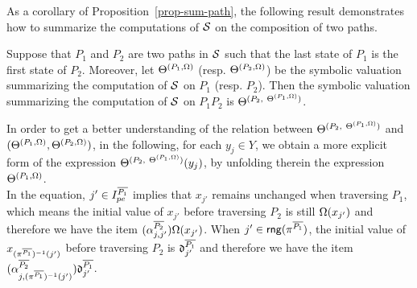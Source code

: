 As a corollary of Proposition~\ref{prop-sum-path}, the following result demonstrates how to summarize the computations of ${\mathcal{S} }$ on the composition of two paths.

\begin{corollary}\label{cor-comp-two-paths}
Suppose that $P_1$ and $P_2$ are two paths in ${\mathcal{S} }$ such that the last state of $P_1$ is the first state of $P_2$. Moreover, let $\Theta^{(P_1, \Omega)}$ (resp. $\Theta^{(P_2, \Omega)}$) be the symbolic valuation summarizing the computation of ${\mathcal{S} }$ on $P_1$ (resp. $P_2$). Then the symbolic valuation summarizing the computation of ${\mathcal{S} }$ on $P_1 P_2$ is $\sumf^{(P_2,\ \sumf^{(P_1,\initval)})}$.
\end{corollary}

In order to get a better understanding of the relation between $\sumf^{(P_2,\ \sumf^{(P_1,\initval)})}$ and $(\Theta^{(P_1, \Omega)},\Theta^{(P_2, \Omega)})$, in the following, for each $y_j \in Y$, we obtain a more explicit form of the expression $\sumf^{(P_2,\ \sumf^{(P_1,\initval)})}(y_j)$, by unfolding therein the expression $\Theta^{(P_1,\Omega)}$\medskip.
\medskip\\
In the equation, $j'\in  I^{\overline{P_1}}_{pe}$ implies that $x_{j'}$ remains unchanged when traversing $P_1$, which means the initial value of $x_{j'}$ before traversing $P_2$ is still $\Omega(x_{j'})$ and therefore we have the item $ (\alpha^{\overline{P_2}}_{j,j'}) \Omega(x_{j'})$. When $j' \in \mathsf{rng}(\pi^{\overline{P_1}})$, the initial value of $x_{(\pi^{\overline{P_1}})^{-1}(j')}$ before traversing $P_2$ is $\mathfrak{d}^{\overline{P_1}}_{j'}$ and therefore we have the item $( \alpha^{\overline{P_2}}_{j,(\pi^{\overline{P_1}})^{-1}(j')}) \mathfrak{d}^{\overline{P_1}}_{j'}$.
